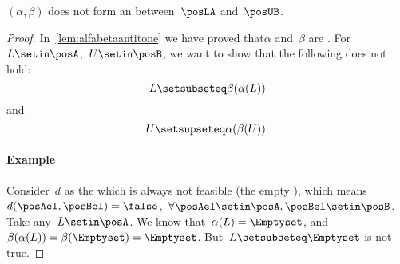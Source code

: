 
\begin{lemma}\label{lem:alpha-beta-not-antitone}
    $(\alpha, \beta)$ does not form an  between~$\posLA$ and~$\posUB$.
\end{lemma}
\begin{proof}
    In~\cref{lem:alfabetaantitone} we have proved that$\alpha$ and~$\beta$ are .
    For~$L\setin \posA$,~$U\setin \posB$, we want to show that the following does not hold:
    \begin{equation}
        \label{eq:alfabetafirst}
        L\setsubseteq \beta(\alpha(L))
    \end{equation}
    and
    \begin{equation}
        \label{eq:alfabetasec}
        U\setsupseteq \alpha(\beta(U)).
    \end{equation}

    \paragraph{Example}
    Consider~$d$ as the  which is always not feasible (the empty ), which means~$d(\posAel,\posBel)=\false$,~$\forall \posAel\setin \posA,\posBel\setin \posB$.
    Take any~$L\setin \posA$.
    We know that~$\alpha(L)=\Emptyset$, and~$\beta(\alpha(L))=\beta(\Emptyset)=\Emptyset$.
    But~$L\setsubseteq \Emptyset$ is not true.
\end{proof}

